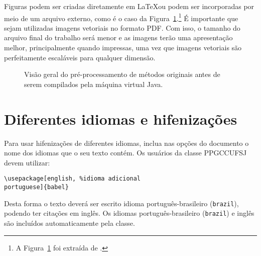 Figuras podem ser criadas diretamente em \LaTeX ou podem ser 
incorporadas por meio de um arquivo externo, 
como é o caso da Figura~\ref{fig:execution_flow}.\footnote{A Figura~\ref{fig:execution_flow} foi extraída de \citet{speeding_up_mutation_testing}.} 
É importante que sejam utilizadas imagens vetoriais no formato PDF. 
Com isso, o tamanho do arquivo final do trabalho será menor e as imagens terão uma apresentação melhor, 
principalmente quando impressas, uma vez que imagens vetoriais são perfeitamente escaláveis para qualquer dimensão. 

\begin{figure}[H]
 \center
 \caption{Visão geral do pré-processamento de métodos originais antes de serem compilados pela máquina virtual Java.}
 \label{fig:execution_flow}
\end{figure}

\section{Diferentes idiomas e hifenizações}
\label{sec-hifenizacao}

Para usar hifenizações de diferentes idiomas, inclua nas opções do documento o
nome dos idiomas que o seu texto contém. Os usuários da classe PPGCCUFSJ devem utilizar:

\begin{verbatim}
\usepackage[english, %idioma adicional
portuguese]{babel} 
\end{verbatim}

Desta forma o texto deverá ser escrito idioma português-brasileiro (\texttt{brazil}), podendo ter citações em inglês.
Os idiomas português-brasileiro (\texttt{brazil}) e inglês são incluídos automaticamente pela classe.

